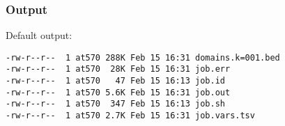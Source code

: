 \subsubsection{Output} %
Default output: %
\begin{lstlisting}
-rw-r--r--  1 at570 288K Feb 15 16:31 domains.k=001.bed
-rw-r--r--  1 at570  28K Feb 15 16:31 job.err
-rw-r--r--  1 at570   47 Feb 15 16:13 job.id
-rw-r--r--  1 at570 5.6K Feb 15 16:31 job.out
-rw-r--r--  1 at570  347 Feb 15 16:13 job.sh
-rw-r--r--  1 at570 2.7K Feb 15 16:31 job.vars.tsv
\end{lstlisting}
% 
\clearpage